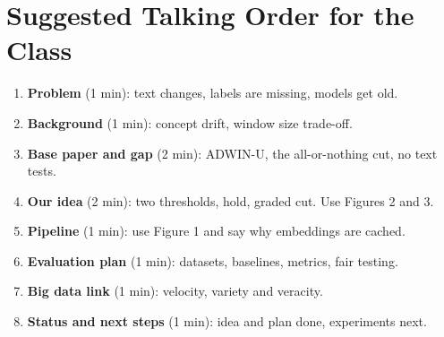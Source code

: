 \documentclass[11pt,a4paper]{article}
\begin{document}
\section{Suggested Talking Order for the Class}

\begin{enumerate}
  \item \textbf{Problem} (1 min): text changes, labels are missing, models get old.
  \item \textbf{Background} (1 min): concept drift, window size trade-off.
  \item \textbf{Base paper and gap} (2 min): ADWIN-U, the all-or-nothing cut, no text tests.
  \item \textbf{Our idea} (2 min): two thresholds, hold, graded cut. Use Figures 2 and 3.
  \item \textbf{Pipeline} (1 min): use Figure 1 and say why embeddings are cached.
  \item \textbf{Evaluation plan} (1 min): datasets, baselines, metrics, fair testing.
  \item \textbf{Big data link} (1 min): velocity, variety and veracity.
  \item \textbf{Status and next steps} (1 min): idea and plan done, experiments next.
\end{enumerate}
\end{document}
